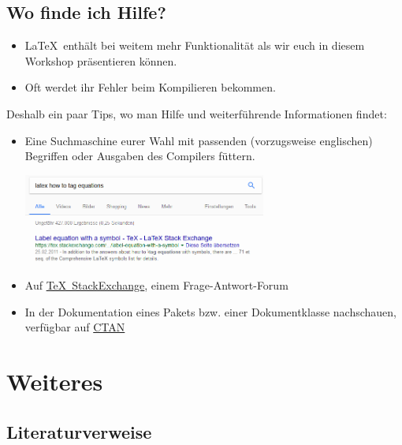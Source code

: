 \documentclass[german]{f1rstlady/templates/presentation}
\begin{document}
\subsection{Wo finde ich Hilfe?}

\begin{frame}{\subsecname}
\begin{itemize}
    \item \LaTeX\ enthält bei weitem mehr Funktionalität als wir euch in diesem Workshop präsentieren
        können.
    \item Oft werdet ihr Fehler beim Kompilieren bekommen.
\end{itemize}
Deshalb ein paar Tips, wo man Hilfe und weiterführende Informationen findet:
\begin{itemize}
    \item Eine \alert{Suchmaschine} eurer Wahl mit passenden (vorzugsweise englischen) Begriffen
        oder Ausgaben des Compilers füttern.
        \begin{center}
            \includegraphics[keepaspectratio,width=8cm]{images/google.png}
        \end{center}
    \item Auf \href{https://tex.stackexchange.com}{\alert{\TeX~StackExchange}}, einem
        Frage-Antwort-Forum
    \item In der \alert{Dokumentation} eines Pakets bzw. einer Dokumentklasse nachschauen, verfügbar
        auf \href{https://ctan.org}{CTAN}
\end{itemize}
\end{frame}

\section{Weiteres}

\subsection{Literaturverweise}
\end{document}
